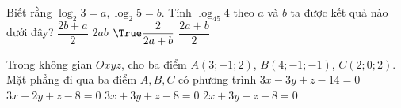 \begin{ex}%
Biết rằng $\log _2 3=a, \log _2 5=b$. Tính $\log _{45} 4$ theo $a$ và $b$ ta được kết quả nào dưới đây?
\choice
{ $\dfrac{2 b+a}{2}$}
{ $2 a b$}
{$\True\dfrac{2}{2 a+b}$}
{$\dfrac{2 a+b}{2}$}
\end{ex}
\begin{ex}%
Trong không gian $O x y z$, cho ba điểm $A(3 ;-1 ; 2)$, $B(4 ;-1 ;-1)$, $C(2 ; 0 ; 2)$. Mặt phẳng đi qua ba điểm $A, B, C$ có phương trình
\choice
{$3 x-3 y+z-14=0$}
{$3 x-2 y+z-8=0$}
{\True $3 x+3 y+z-8=0$}
{$2 x+3 y-z+8=0$}
\end{ex}
